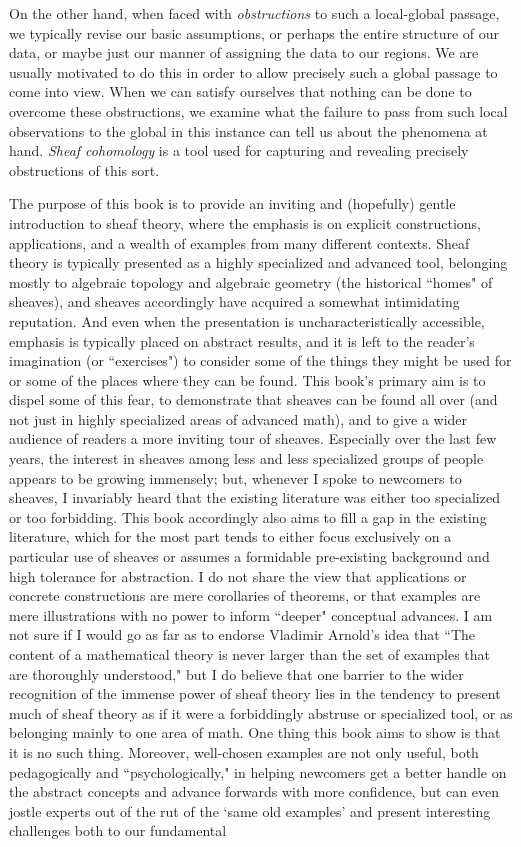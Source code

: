 \documentclass[a4paper]{book}
\theoremstyle{definition}
\theoremstyle{definition}
\theoremstyle{definition}
\theoremstyle{theorem}
\theoremstyle{definition}
\begin{document}
	On the other hand, when faced with \textit{obstructions} to such a local-global passage, we typically revise our basic assumptions, or perhaps the entire structure of our data, or maybe just our manner of assigning the data to our regions. We are usually motivated to do this in order to allow precisely such a global passage to come into view. When we can satisfy ourselves that nothing can be done to overcome these obstructions, we examine what the failure to pass from such local observations to the global in this instance can tell us about the phenomena at hand. \textit{Sheaf cohomology} is a tool used for capturing and revealing precisely obstructions of this sort. \par     
	The purpose of this book is to provide an inviting and (hopefully) gentle introduction to sheaf theory, where the emphasis is on explicit constructions, applications, and a wealth of examples from many different contexts. Sheaf theory is typically presented as a highly specialized and advanced tool, belonging mostly to algebraic topology and algebraic geometry (the historical ``homes" of sheaves), and sheaves accordingly have acquired a somewhat intimidating reputation. And even when the presentation is uncharacteristically accessible, emphasis is typically placed on abstract results, and it is left to the reader's imagination (or ``exercises") to consider some of the things they might be used for or some of the places where they can be found. This book's primary aim is to dispel some of this fear, to demonstrate that sheaves can be found all over (and not just in highly specialized areas of advanced math), and to give a wider audience of readers a more inviting tour of sheaves. Especially over the last few years, the interest in sheaves among less and less specialized groups of people appears to be growing immensely; but, whenever I spoke to newcomers to sheaves, I invariably heard that the existing literature was either too specialized or too forbidding. This book accordingly also aims to fill a gap in the existing literature, which for the most part tends to either focus exclusively on a particular use of sheaves or assumes a formidable pre-existing background and high tolerance for abstraction. I do not share the view that applications or concrete constructions are mere corollaries of theorems, or that examples are mere illustrations with no power to inform ``deeper" conceptual advances. I am not sure if I would go as far as to endorse Vladimir Arnold's  idea that ``The content of a mathematical theory is never larger than the set of examples that are thoroughly understood," but I do believe that one barrier to the wider recognition of the immense power of sheaf theory lies in the tendency to present much of sheaf theory as if it were a forbiddingly abstruse or specialized tool, or as belonging mainly to one area of math. One thing this book aims to show is that it is no such thing. Moreover, well-chosen examples are not only useful, both pedagogically and ``psychologically," in helping newcomers get a better handle on the abstract concepts and advance forwards with more confidence, but can even jostle experts out of the rut of the `same old examples' and present interesting challenges both to our fundamental 
\end{document}
